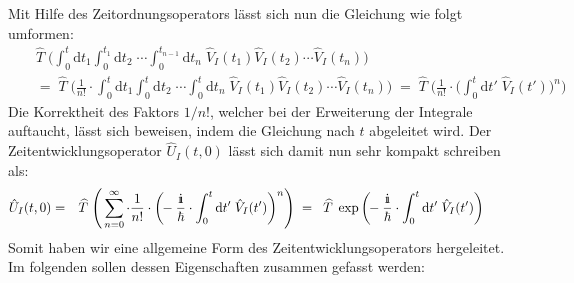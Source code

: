 Mit Hilfe des Zeitordnungsoperators lässt sich nun die Gleichung wie folgt umformen:
\begin{eqnarray*}
	&&\!\!\!\!\! \widehat{T}\;\bigg( \int_0^{t}\mathrm{d}t_1 \int_0^{t_1}\mathrm{d}t_2\;\cdots\int_0^{t_{n-1}}\mathrm{d}t_n\; \hat{V}_I(t_1)\hat{V}_I(t_2) \cdots \hat{V}_I(t_n) \bigg)
	\\
	&&\!=\;\widehat{T}\;\bigg( \frac{1}{n!}\cdot \int_0^{t}\mathrm{d}t_1 \int_0^{t}\mathrm{d}t_2\;\cdots\int_0^{t}\mathrm{d}t_n\; \hat{V}_I(t_1)\hat{V}_I(t_2) \cdots \hat{V}_I(t_n) \bigg) \;=\; \widehat{T}\;\Bigg( \frac{1}{n!}\cdot \bigg(\int_0^{t}\mathrm{d}t'\; \hat{V}_I(t')\bigg)^n \Bigg)
\end{eqnarray*}
Die Korrektheit des Faktors $1/n!$, welcher bei der Erweiterung der Integrale auftaucht, lässt sich beweisen, indem die Gleichung nach $t$ abgeleitet wird. Der Zeitentwicklungsoperator $\hat{U}_I(t,0)$ lässt sich damit nun sehr kompakt schreiben als: 
\begin{eqnarray}
	\hat{U}_I(t,0) &=& \widehat{T}\;\Bigg( \sum_{n=0}^{\infty} \cdot \frac{1}{n!}\cdot \bigg(\!\!-\frac{\I}{\hbar}\cdot\int_0^{t}\mathrm{d}t'\; \hat{V}_I(t')\bigg)^n \Bigg) \;=\;\; \widehat{T}\;\exp \bigg(\!\!-\frac{\I}{\hbar}\cdot\int_0^{t}\mathrm{d}t'\; \hat{V}_I(t')\bigg) \qquad\label{Zeitentwicklungsoperator}
\end{eqnarray}
Somit haben wir eine allgemeine Form des Zeitentwicklungsoperators hergeleitet. Im folgenden sollen dessen Eigenschaften zusammen gefasst werden: 

